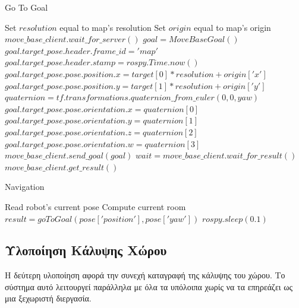 \begin{algorithm}[H]
\caption{Go To Goal}
\label{alg:go_to_goal}
\begin{algorithmic}[1]
        \State Set $resolution$ equal to map's resolution
        \State Set $origin$ equal to map's origin
        \State $move\_base\_client.wait\_for\_server()$
        \State $goal = MoveBaseGoal()$
        \State $goal.target\_pose.header.frame\_id = 'map'$
        \State $goal.target\_pose.header.stamp = rospy.Time.now()$
        \State $goal.target\_pose.pose.position.x = target[0]*resolution + origin['x']$
        \State $goal.target\_pose.pose.position.y = target[1]*resolution + origin['y']$
        \State $quaternion = tf.transformations.quaternion\_from\_euler(0, 0, yaw)$
        \State $goal.target\_pose.pose.orientation.x = quaternion[0]$
        \State $goal.target\_pose.pose.orientation.y = quaternion[1]$
        \State $goal.target\_pose.pose.orientation.z = quaternion[2]$
        \State $goal.target\_pose.pose.orientation.w = quaternion[3]$
        \State $move\_base\_client.send\_goal(goal)$
        \State $wait = move\_base\_client.wait\_for\_result()$
        \State \Return $move\_base\_client.get\_result()$
\end{algorithmic}
\end{algorithm}



\begin{algorithm}[H]
\caption{Navigation}
\label{alg:navigation}
\begin{algorithmic}[1]
    \State Read robot's current pose
    \State Compute current room
            \State $result = goToGoal(pose['position'], pose['yaw'])$
            \State $rospy.sleep(0.1)$
        \EndFor
    \EndFor
    \State \Return 
\end{algorithmic}
\end{algorithm}

\subsection{Υλοποίηση Κάλυψης Χώρου}
\label{section:coverage_implementation}

Η δεύτερη υλοποίηση αφορά την συνεχή καταγραφή της κάλυψης του χώρου. Το σύστημα αυτό λειτουργεί παράλληλα με όλα τα υπόλοιπα χωρίς να τα επηρεάζει ως μια ξεχωριστή διεργασία. 

